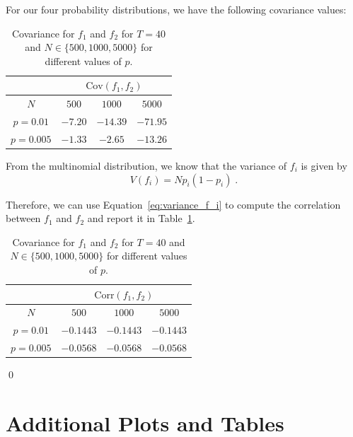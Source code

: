 For our four probability distributions, we have the following covariance values:
\begin{table}[h]
    \centering
    \begin{tabular}{c|c c c}
        \toprule
         & \multicolumn{3}{c}{$\mathrm{Cov}(f_1, f_2)$} \\
        \midrule
        $N$ & $500$ & $1000$ & $5000$ \\
        \midrule
        $p=0.01$  & $-7.20$   & $-14.39$  & $-71.95$ \\
        $p=0.005$ & $-1.33$   & $-2.65$   & $-13.26$ \\
    \end{tabular}
    \caption{Covariance for $f_1$ and $f_2$ for $T=40$ and $N \in \{500, 1000, 5000\}$ for different values of $p$.}
\end{table}

From the multinomial distribution, we know that the variance of $f_i$ is given by
\begin{equation}
    V(f_i) = N p_i (1-p_i)\;. \label{eq:variance_f_i}
\end{equation}

Therefore, we can use Equation~\ref{eq:variance_f_i} to compute the correlation between $f_1$ and $f_2$ and report it in Table~\ref{tab:correlation_f1_f2}.
\begin{table}[h]
    \centering
    \begin{tabular}{c|c c c}
        \toprule
         & \multicolumn{3}{c}{$\mathrm{Corr}(f_1, f_2)$} \\
        \midrule
        $N$ & $500$ & $1000$ & $5000$ \\
        \midrule
        $p=0.01$  & $-0.1443$   & $-0.1443$  & $-0.1443$ \\
        $p=0.005$ & $-0.0568$   & $-0.0568$  & $-0.0568$ \\
    \end{tabular}
    \caption{Covariance for $f_1$ and $f_2$ for $T=40$ and $N \in \{500, 1000, 5000\}$ for different values of $p$.}
    \label{tab:correlation_f1_f2}
\end{table}

\qed

\section{Additional Plots and Tables}

